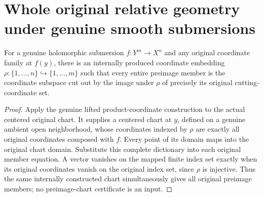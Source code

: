 \section{Whole original relative geometry under genuine smooth submersions}

\begin{theorem}
\label{hir:submersion-relative-coordinate-families}
For a genuine holomorphic submersion $f:Y^m\to X^n$ and any original
coordinate family at $f(y)$, there is an internally produced coordinate
embedding $\rho:\{1,\ldots,n\}\hookrightarrow\{1,\ldots,m\}$ such that
every entire preimage member is the coordinate subspace cut out by the
image under $\rho$ of precisely its original cutting-coordinate set.
\end{theorem}
\begin{proof}
Apply the genuine lifted product-coordinate construction to the actual
centered original chart. It supplies a centered chart at $y$, defined on
a genuine ambient open neighborhood, whose coordinates indexed by
$\rho$ are exactly all original coordinates composed with $f$.
Every point of its domain maps into the original chart domain. Substitute
this complete dictionary into each original member equation. A vector
vanishes on the mapped finite index set exactly when its original
coordinates vanish on the original index set, since $\rho$ is injective.
Thus the same internally constructed chart simultaneously gives all
original preimage members; no preimage-chart certificate is an input.
\end{proof}
\leanok

